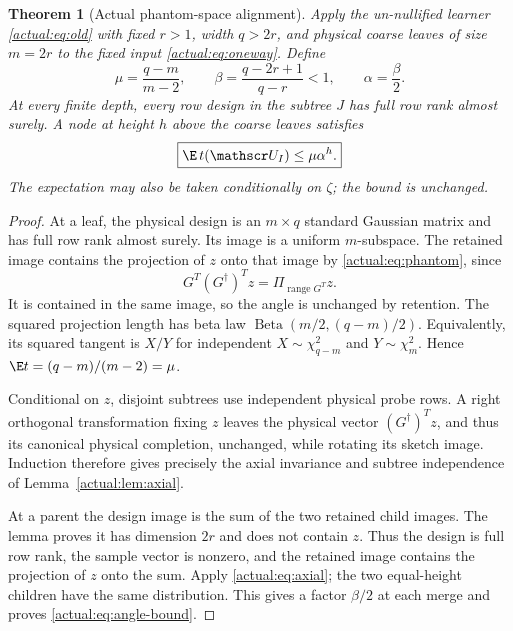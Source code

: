 \documentclass[11pt,oneside,openany,a4paper]{book}
\numberwithin{equation}{chapter}
\newtheorem{theorem}{Theorem}[chapter]
\theoremstyle{definition}
\theoremstyle{remark}
\DeclareMathOperator{\ran}{range}\DeclareMathOperator{\OPT}{OPT}
\begin{document}
\begin{theorem}[Actual phantom-space alignment]\label{actual:thm:alignment}
Apply the un-nullified learner \eqref{actual:eq:old} with fixed $r>1$, width $q>2r$, and physical coarse leaves of size $m=2r$ to the fixed input \eqref{actual:eq:oneway}. Define
\begin{equation}\label{actual:eq:parameters}
 \mu=\frac{q-m}{m-2},\qquad
 \beta=\frac{q-2r+1}{q-r}<1,\qquad \alpha=\frac\beta2.
\end{equation}
At every finite depth, every row design in the subtree $J$ has full row rank almost surely. A node at height $h$ above the coarse leaves satisfies
\begin{equation}\label{actual:eq:angle-bound}
 \boxed{\E\,t(\mathscr U_I)\le\mu\alpha^h.}
\end{equation}
The expectation may also be taken conditionally on $\zeta$; the bound is unchanged.
\end{theorem}
\begin{proof}
At a leaf, the physical design is an $m\times q$ standard Gaussian matrix and has full row rank almost surely. Its image is a uniform $m$-subspace. The retained image contains the projection of $z$ onto that image by \eqref{actual:eq:phantom}, since
\[
 G^T(G^\dagger)^Tz=\Pi_{\ran G^T}z.
\]
It is contained in the same image, so the angle is unchanged by retention. The squared projection length has beta law
$\operatorname{Beta}(m/2,(q-m)/2)$. Equivalently, its squared tangent is
$X/Y$ for independent $X\sim\chi^2_{q-m}$ and $Y\sim\chi^2_m$. Hence
$\E t=(q-m)/(m-2)=\mu$.

Conditional on $z$, disjoint subtrees use independent physical probe rows. A right orthogonal transformation fixing $z$ leaves the physical vector $(G^\dagger)^Tz$, and thus its canonical physical completion, unchanged, while rotating its sketch image. Induction therefore gives precisely the axial invariance and subtree independence of Lemma~\ref{actual:lem:axial}.

At a parent the design image is the sum of the two retained child images. The lemma proves it has dimension $2r$ and does not contain $z$. Thus the design is full row rank, the sample vector is nonzero, and the retained image contains the projection of $z$ onto the sum. Apply \eqref{actual:eq:axial}; the two equal-height children have the same distribution. This gives a factor $\beta/2$ at each merge and proves \eqref{actual:eq:angle-bound}.
\end{proof}
\end{document}
